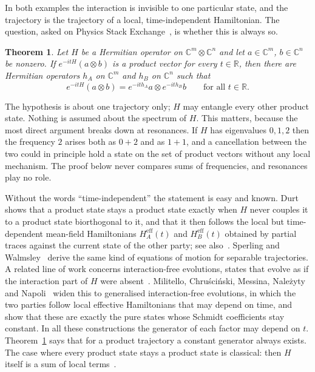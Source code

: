 \documentclass[11pt]{article}
\newtheorem{theorem}{Theorem}
\theoremstyle{remark}
\newcommand{\C}{\mathbb{C}}
\newcommand{\R}{\mathbb{R}}
\begin{document}
In both examples the interaction is invisible to one particular state, and the trajectory is
the trajectory of a local, time-independent Hamiltonian. The question, asked on Physics Stack
Exchange~\cite{SE816017}, is whether this is always so.

\begin{theorem}\label{thm:main}
Let $H$ be a Hermitian operator on $\C^m\otimes\C^n$ and let $a\in\C^m$, $b\in\C^n$ be
nonzero. If $e^{-itH}(a\otimes b)$ is a product vector for every $t\in\R$, then there are
Hermitian operators $h_A$ on $\C^m$ and $h_B$ on $\C^n$ such that
\[
e^{-itH}(a\otimes b)=e^{-ith_A}a\otimes e^{-ith_B}b\qquad\text{for all }t\in\R .
\]
\end{theorem}

The hypothesis is about one trajectory only; $H$ may entangle every other product state.
Nothing is assumed about the spectrum of $H$. This matters, because the most direct argument
breaks down at resonances. If $H$ has eigenvalues $0,1,2$ then the frequency $2$ arises both
as $0+2$ and as $1+1$, and a cancellation between the two could in principle hold a state on
the set of product vectors without any local mechanism. The proof below never compares sums of
frequencies, and resonances play no role.

Without the words ``time-independent'' the statement is easy and known. Durt~\cite{Durt2001}
shows that a product state stays a product state exactly when $H$ never couples it to a product
state biorthogonal to it, and that it then follows the local but time-dependent mean-field
Hamiltonians $H_A^{\mathrm{eff}}(t)$ and $H_B^{\mathrm{eff}}(t)$ obtained by partial traces
against the current state of the other party; see also~\cite{Durt2004}. Sperling and
Walmsley~\cite{SperlingWalmsley} derive the same kind of equations of motion for separable
trajectories. A related line of work concerns interaction-free evolutions, states that evolve
as if the interaction part of $H$ were absent~\cite{NGMC14,CNGNM15}. Militello, Chru\'sci\'nski,
Messina, Nale\.zyty and Napoli~\cite{MCMNN16} widen this to generalised interaction-free
evolutions, in which the two parties follow local effective Hamiltonians that may depend on
time, and show that these are exactly the pure states whose Schmidt coefficients stay
constant. In all these constructions the generator of each factor may depend on $t$.
Theorem~\ref{thm:main} says that for a product trajectory a constant generator always exists. The case where every product state stays a product state is classical: then
$H$ itself is a sum of local terms~\cite{Durt2001}.
\end{document}
